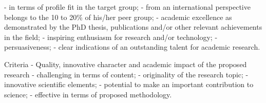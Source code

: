 
- in terms of profile fit in the target group; - from an international perspective belongs to the 10 to 20\% of his/her peer group; - academic excellence as demonstrated by the PhD thesis, publications and/or other relevant achievements in the field; - inspiring enthusiasm for research and/or technology; - persuasiveness; - clear indications of an outstanding talent for academic research. 

Criteria - Quality, innovative character and academic impact of the proposed research 
- challenging in terms of content; - originality of the research topic; - innovative scientific elements; - potential to make an important contribution to science; - effective in terms of proposed methodology.